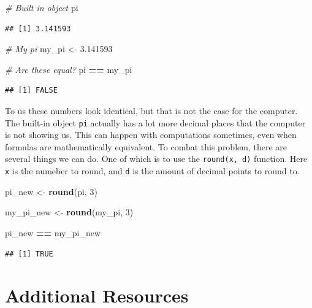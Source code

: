 \documentclass[
]{book}
\newenvironment{Shaded}{\begin{snugshade}}{\end{snugshade}}
\newcommand{\CommentTok}[1]{\textcolor[rgb]{0.56,0.35,0.01}{\textit{#1}}}
\newcommand{\DecValTok}[1]{\textcolor[rgb]{0.00,0.00,0.81}{#1}}
\newcommand{\FloatTok}[1]{\textcolor[rgb]{0.00,0.00,0.81}{#1}}
\newcommand{\KeywordTok}[1]{\textcolor[rgb]{0.13,0.29,0.53}{\textbf{#1}}}
\newcommand{\NormalTok}[1]{#1}
\newcommand{\OperatorTok}[1]{\textcolor[rgb]{0.81,0.36,0.00}{\textbf{#1}}}
\newcommand{\StringTok}[1]{\textcolor[rgb]{0.31,0.60,0.02}{#1}}
\begin{document}
\begin{Shaded}
\begin{Highlighting}[]
\CommentTok{# Built in object}
\NormalTok{pi}
\end{Highlighting}
\end{Shaded}

\begin{verbatim}
## [1] 3.141593
\end{verbatim}

\begin{Shaded}
\begin{Highlighting}[]
\CommentTok{# My pi}
\NormalTok{my_pi <-}\StringTok{ }\FloatTok{3.141593}

\CommentTok{# Are these equal?}
\NormalTok{pi }\OperatorTok{==}\StringTok{ }\NormalTok{my_pi}
\end{Highlighting}
\end{Shaded}

\begin{verbatim}
## [1] FALSE
\end{verbatim}

To us these numbers look identical, but that is not the case for the computer. The built-in object \texttt{pi} actually has a lot more decimal places that the computer is not showing us. This can happen with computations sometimes, even when formulas are mathematically equivalent. To combat this problem, there are several things we can do. One of which is to use the \texttt{round(x,\ d)} function. Here \texttt{x} is the numeber to round, and \texttt{d} is the amount of decimal points to round to.

\begin{Shaded}
\begin{Highlighting}[]
\NormalTok{pi_new <-}\StringTok{ }\KeywordTok{round}\NormalTok{(pi, }\DecValTok{3}\NormalTok{)}

\NormalTok{my_pi_new <-}\StringTok{ }\KeywordTok{round}\NormalTok{(my_pi, }\DecValTok{3}\NormalTok{)}

\NormalTok{pi_new }\OperatorTok{==}\StringTok{ }\NormalTok{my_pi_new}
\end{Highlighting}
\end{Shaded}

\begin{verbatim}
## [1] TRUE
\end{verbatim}

\hypertarget{additional-resources}{%
\section*{Additional Resources}\label{additional-resources}}
\end{document}
